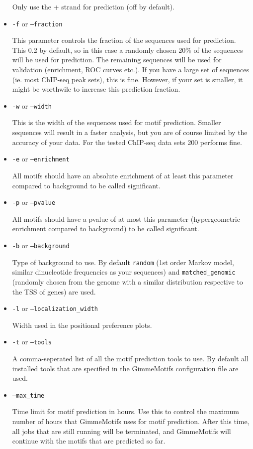 \documentclass[11pt]{article}
\begin{document}
\begin{itemize}
Only use the + strand for prediction (off by default).

\item 
\texttt{-f} or \texttt{--fraction}

This parameter controls the fraction of the sequences used for prediction. This 0.2 by default, so in this case a randomly chosen 20\% of the sequences will be used for prediction. The remaining sequences will be used for validation (enrichment, ROC curves etc.). If you have a large set of sequences (ie. most ChIP-seq peak sets), this is fine. However, if your set is smaller, it might be worthwile to increase this prediction fraction.

\item 
\texttt{-w} or \texttt{--width}

This is the width of the sequences used for motif prediction. Smaller sequences will result in a faster analysis, but you are of course limited by the accuracy of your data. For the tested ChIP-seq data sets 200 performs fine.

\item 
\texttt{-e} or \texttt{--enrichment}

All motifs should have an absolute enrichment of at least this parameter compared to background to be called significant.

\item 
\texttt{-p} or \texttt{--pvalue}

All motifs should have a pvalue of at most this parameter (hypergeometric enrichment compared to background) to be called significant.

\item 
\texttt{-b} or \texttt{--background}

Type of background to use. By default \texttt{random} (1st order Markov model, similar dinucleotide frequencies as your sequences) and \texttt{matched\_genomic} (randomly chosen from the genome with a similar distribution respective to the TSS of genes) are used.

\item 
\texttt{-l} or \texttt{--localization\_width}

Width used in the positional preference plots.

\item 
\texttt{-t} or \texttt{--tools}

A comma-seperated list of all the motif prediction tools to use. By default all installed tools that are specified in the GimmeMotifs configuration file are used.

\item
\texttt{--max\_time}

 Time limit for motif prediction in hours. Use this to control the maximum number of hours that GimmeMotifs uses for motif prediction. After this time, all jobs that are still running will be terminated, and GimmeMotifs will continue with the motifs that are predicted so far.

\end{itemize}
\end{document}
